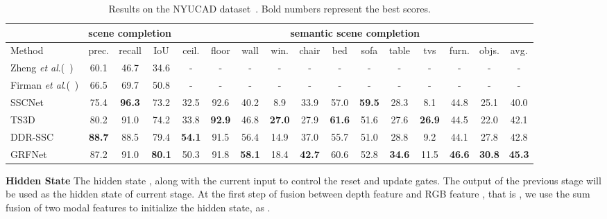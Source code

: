 \documentclass[10pt,twocolumn,letterpaper]{article}
\def\etal{\emph{et al}.}
\begin{document}
\begin{table*}[t]
\begin{center}
\scalebox{0.8}
{
\begin{tabular} {l |c c c|c c c c c c c c c c c|c} \hline
 &  \multicolumn{3}{c|}{scene completion} & \multicolumn{12}{c}{semantic scene completion} \\ 
\hline
Method  & prec. & recall & IoU & \cellcolor{rgb1}ceil. & \cellcolor{rgb2}floor & \cellcolor{rgb3}wall & \cellcolor{rgb4}win. & \cellcolor{rgb5}chair & \cellcolor{rgb6}bed & \cellcolor{rgb7}sofa & \cellcolor{rgb8}table & \cellcolor{rgb9}tvs & \cellcolor{rgb10}furn. & \cellcolor{rgb11}objs. & avg. \\ 
\hline
Zheng \etal(~\cite{zheng2013beyond}) 	& 60.1 & 46.7 & 34.6 & - & - & - & - & - & - & - & - & - & - & - & - \\ 
Firman \etal(~\cite{firman2016NYUCAD}) 	& 66.5 & 69.7 & 50.8 & - & - & - & - & - & - & - & - & - & - & - & - \\ 
SSCNet~\cite{song2017_SSCNet}   & 75.4 & {\bfseries 96.3} & 73.2 & 32.5 & 92.6 & 40.2 &  8.9 & 33.9 & 57.0 & {\bfseries 59.5} & 28.3 &  8.1 &  44.8 & 25.1 & 40.0\\ 
TS3D~\cite{Garbade2018_twoStream}      	& 80.2 & 91.0 & 74.2 & 33.8 & {\bfseries 92.9} & 46.8 & {\bfseries 27.0} & 27.9 & {\bfseries 61.6} & 51.6 & 27.6 & {\bfseries 26.9} & 44.5 & 22.0 & 42.1\\ 
DDR-SSC~\cite{li2019rgbd}   & {\bfseries 88.7} & 88.5 & 79.4 & {\bfseries 54.1} & 91.5 & 56.4 & 14.9 & 37.0 & 55.7 & 51.0 &  28.8 & 9.2 & 44.1 &  27.8 & 42.8 \\

GRFNet        	& 87.2 & 91.0 & {\bfseries 80.1} & 50.3& 91.8& {\bfseries 58.1 } & 18.4 & {\bfseries 42.7} & 60.6 & 52.8 & {\bfseries 34.6 }&  11.5 & {\bfseries 46.6} & {\bfseries 30.8} & {\bfseries 45.3} \\
\hline
\end{tabular}
}  \caption{Results on the NYUCAD dataset~\cite{zheng2013beyond}. Bold numbers represent the best scores.
}
\label{tab:NYUCAD}
\end{center}
\end{table*}



\noindent
\textbf{Hidden State}
The hidden state , along with the current input  to control the reset and update gates.
The output of the previous stage will be used as the hidden state of current stage.
At the first step of fusion between depth feature  and RGB feature , that is , we use the sum fusion of two modal features to initialize the hidden state, as .
\end{document}
